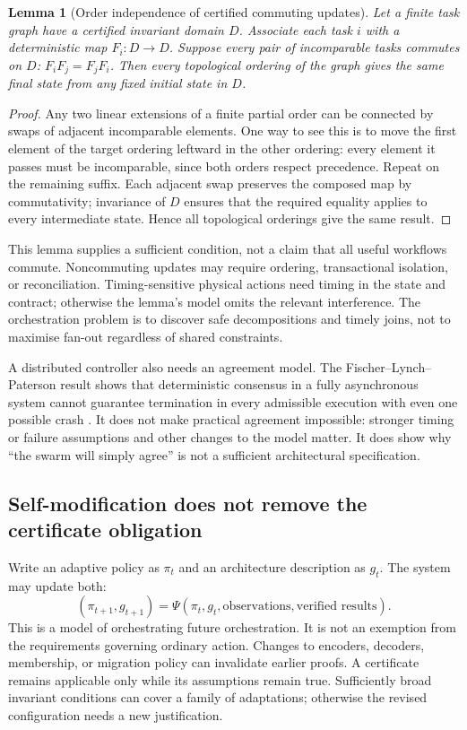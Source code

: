 \documentclass[11pt,a4paper]{article}
\newtheorem{lemma}[theorem]{Lemma}
\theoremstyle{definition}
\theoremstyle{remark}
\begin{document}
\begin{lemma}[Order independence of certified commuting updates]\label{lem:commute}
Let a finite task graph have a certified invariant domain $D$. Associate each task $i$ with a deterministic map $F_i:D\to D$. Suppose every pair of incomparable tasks commutes on $D$: $F_iF_j=F_jF_i$. Then every topological ordering of the graph gives the same final state from any fixed initial state in $D$.
\end{lemma}
\begin{proof}
Any two linear extensions of a finite partial order can be connected by swaps of adjacent incomparable elements. One way to see this is to move the first element of the target ordering leftward in the other ordering: every element it passes must be incomparable, since both orders respect precedence. Repeat on the remaining suffix. Each adjacent swap preserves the composed map by commutativity; invariance of $D$ ensures that the required equality applies to every intermediate state. Hence all topological orderings give the same result.
\end{proof}
This lemma supplies a sufficient condition, not a claim that all useful workflows commute. Noncommuting updates may require ordering, transactional isolation, or reconciliation. Timing-sensitive physical actions need timing in the state and contract; otherwise the lemma's model omits the relevant interference. The orchestration problem is to discover safe decompositions and timely joins, not to maximise fan-out regardless of shared constraints.

A distributed controller also needs an agreement model. The Fischer--Lynch--Paterson result shows that deterministic consensus in a fully asynchronous system cannot guarantee termination in every admissible execution with even one possible crash \citep{flp}. It does not make practical agreement impossible: stronger timing or failure assumptions and other changes to the model matter. It does show why ``the swarm will simply agree'' is not a sufficient architectural specification.

\subsection{Self-modification does not remove the certificate obligation}
Write an adaptive policy as $\pi_t$ and an architecture description as $g_t$. The system may update both:
\[
 (\pi_{t+1},g_{t+1})=\Psi(\pi_t,g_t,\text{observations},\text{verified results}).
\]
This is a model of orchestrating future orchestration. It is not an exemption from the requirements governing ordinary action. Changes to encoders, decoders, membership, or migration policy can invalidate earlier proofs. A certificate remains applicable only while its assumptions remain true. Sufficiently broad invariant conditions can cover a family of adaptations; otherwise the revised configuration needs a new justification.
\end{document}
